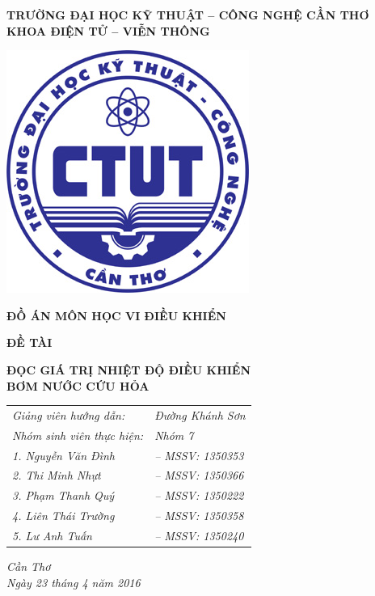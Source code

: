 \begin{titlepage}
	\centering
	\begin{small}
\bfseries{TRƯỜNG ĐẠI HỌC KỸ THUẬT -- CÔNG NGHỆ CẦN THƠ\\KHOA ĐIỆN TỬ -- VIỄN THÔNG\\ \vspace{1cm}}
   \end{small}
	\includegraphics[width=.3\textwidth]{CTUT_logo}\par\vspace{1cm}
	{\Large\bfseries ĐỒ ÁN MÔN HỌC VI ĐIỀU KHIỂN\vspace{.5cm}\par}
	{\Large\bfseries ĐỀ TÀI\vspace{.5cm}\par}
	{\Large\bfseries ĐỌC GIÁ TRỊ NHIỆT ĐỘ ĐIỀU KHIỂN\\ BƠM NƯỚC CỨU HỎA\par}
	\vspace{2cm}
	
	\begin{tabular}{ll}
	{\Large\itshape Giảng viên hướng dẫn:} & {\Large\itshape Đường Khánh Sơn}\vspace{.3cm}\\
	{\Large\itshape Nhóm sinh viên thực hiện:} &{\Large\itshape Nhóm 7}\vspace{.2cm}\\
		{\Large\itshape \hspace{1.5cm}1. Nguyễn Văn Đình}& {\Large\itshape -- MSSV: 1350353}\vspace{.2cm}\\
	{\Large\itshape \hspace{1.5cm}2. Thi Minh Nhựt}& {\Large\itshape -- MSSV: 1350366}\vspace{.2cm}\\
	{\Large\itshape \hspace{1.5cm}3. Phạm Thanh Quý}& {\Large\itshape -- MSSV: 1350222}\vspace{.2cm}\\
		{\Large\itshape \hspace{1.5cm}4. Liên Thái Trường}& {\Large\itshape -- MSSV: 1350358}\vspace{.2cm}\\
		{\Large\itshape \hspace{1.5cm}5. Lư Anh Tuấn}& {\Large\itshape -- MSSV: 1350240}\vspace{.2cm}\\
	\end{tabular}
	
	\vfill
	
	
	\vfill
	
	{\large \textit{Cần Thơ\\ Ngày 23 tháng 4 năm 2016}\par}
\end{titlepage}